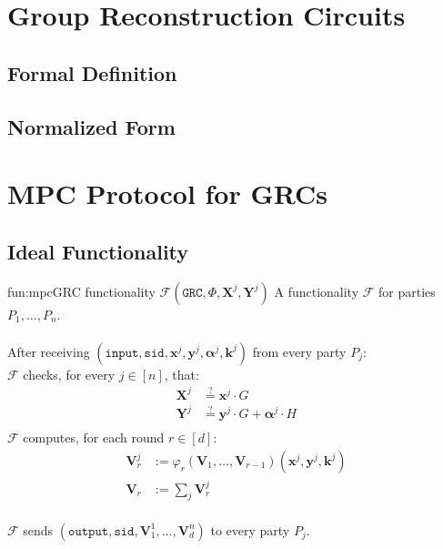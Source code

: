 \section{Group Reconstruction Circuits}

\subsection{Formal Definition}

\subsection{Normalized Form}

\section{MPC Protocol for GRCs}

\subsection{Ideal Functionality}

\begin{afunctionality}{fun:mpc}{GRC functionality $\mathcal{F}(\texttt{GRC}, \Phi, \textbf{X}^j, \textbf{Y}^j)$}
A functionality $\mathcal{F}$ for parties $P_1, \ldots, P_n$.\\
\\
After receiving
$(\texttt{input}, \texttt{sid}, \textbf{x}^j, \textbf{y}^j, \boldsymbol{\alpha}^j, \textbf{k}^j)$ from every party $P_j$:\\
$\mathcal{F}$ checks, for every $j \in [n]$, that:
$$
\begin{aligned}
    \textbf{X}^j &\stackrel{?}{=} \textbf{x}^j \cdot G\\
    \textbf{Y}^j &\stackrel{?}{=} \textbf{y}^j \cdot G + \boldsymbol{\alpha}^j \cdot H\\
\end{aligned}
$$
$\mathcal{F}$ computes, for each round $r \in [d]$:
$$
\begin{aligned}
    \textbf{V}^j_{r} &:= \varphi_{r}(\textbf{V}_{1}, \ldots, \textbf{V}_{r - 1})(
        \textbf{x}^j, \textbf{y}^j, \textbf{k}^j
    )\\
    \textbf{V}_r &:= \sum_j \textbf{V}^j_r
\end{aligned}
$$\\
$\mathcal{F}$ sends $(\texttt{output}, \texttt{sid}, \textbf{V}^1_1, \ldots, \textbf{V}^n_d)$ to every party $P_j$.
\end{afunctionality}

